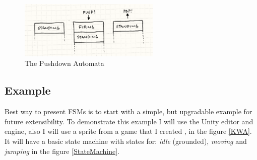 \documentclass[a4paper,12pt,openright]{book}
\begin{document}
\begin{figure}[h]
\begin{center}
\includegraphics[width=0.6\textwidth]{Images/state_pushdown.png}
\end{center}
\caption{The Pushdown Automata \cite{GameProgrammingPattersFMS}}
\label{pic2}
\end{figure}

\subsection{Example}

Best way to present FSMs is to start with a simple, but upgradable example for future extensibility. To demonstrate this example I will use the Unity \cite{UnitySoftware} editor and engine, also I will use a sprite from a game that I created \cite{KWA}, in the figure \ref{KWA}. It will have a basic state machine with states for: \emph{idle} (grounded), \emph{moving} and \emph{jumping} in the figure \ref{StateMachine}.
\end{document}
